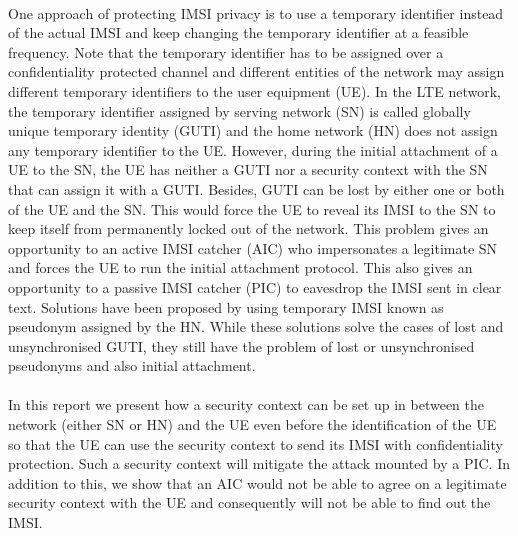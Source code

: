 \documentclass[lnicst,sechang,a4paper]{svmultln}
\begin{document}
\paragraph{}
One approach of protecting IMSI privacy is to use a temporary identifier instead of the actual IMSI and keep changing the temporary identifier at a feasible frequency. Note that the temporary identifier has to be assigned over a confidentiality protected channel and different entities of the network may assign different temporary identifiers to the user equipment (UE). In the LTE network, the temporary identifier assigned by serving network (SN) is called globally unique temporary identity (GUTI) and the home network (HN) does not assign any temporary identifier to the UE. However, during the initial attachment of a UE to the SN, the UE has neither a GUTI nor a security context with the SN that can assign it with a GUTI. Besides, GUTI can be lost by either one or both of the UE and the SN. This would force the UE to reveal its IMSI to the SN to keep itself from permanently locked out of the network. This problem gives an opportunity to an active IMSI catcher (AIC) who impersonates a legitimate SN and forces the UE to run the initial attachment protocol. This also gives an opportunity to a passive IMSI catcher (PIC) to eavesdrop the IMSI sent in clear text. Solutions \cite{pseudonym_valtteri_philip, pseudonym_ericsson} have been proposed by using temporary IMSI known as pseudonym assigned by the HN. While these solutions solve the cases of lost and unsynchronised GUTI, they still have the problem of lost or unsynchronised pseudonyms and also initial attachment.
\paragraph{}
In this report we present how a security context can be set up in between the network (either SN or HN) and the UE even before the identification of the UE so that the UE can use the security context to send its IMSI with confidentiality protection. Such a security context will mitigate the attack mounted by a PIC. In addition to this, we show that an AIC would not be able to agree on a legitimate security context with the UE and consequently will not be able to find out the IMSI.
\end{document}
